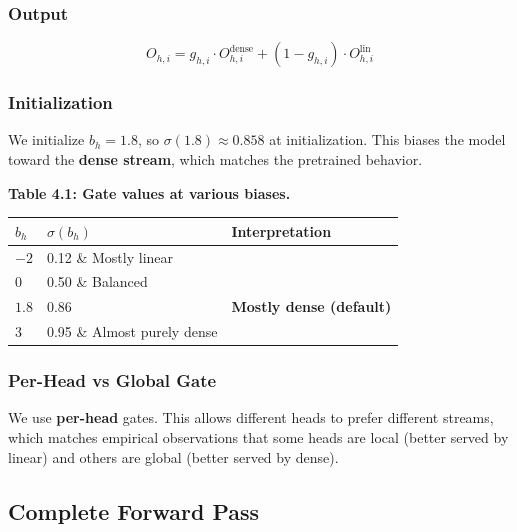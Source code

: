 \subsubsection{Output}

\begin{equation}
O_{h,i} = g_{h,i} \cdot O^\text{dense}_{h,i} + (1 - g_{h,i}) \cdot O^\text{lin}_{h,i}
\end{equation}

\subsubsection{Initialization}

We initialize $b_h = 1.8$, so $\sigma(1.8) \approx 0.858$ at initialization. 
This biases the model toward the \textbf{dense stream}, which matches the 
pretrained behavior.

\textbf{Table 4.1: Gate values at various biases.}

\begin{table}[H]
\centering
\small
\begin{tabular}{lll}
\toprule
\textbf{$b_h$} & \textbf{$\sigma(b_h)$} & \textbf{Interpretation} \\
\midrule
$-2$ & 0.12 \& Mostly linear \\
$0$ & 0.50 \& Balanced \\
$1.8$ & 0.86 & \textbf{Mostly dense (default)} \\
$3$ & 0.95 \& Almost purely dense \\
\bottomrule
\end{tabular}
\end{table}

\subsubsection{Per-Head vs Global Gate}

We use \textbf{per-head} gates. This allows different heads to prefer different 
streams, which matches empirical observations that some heads are local 
(better served by linear) and others are global (better served by dense).

\subsection{Complete Forward Pass}

